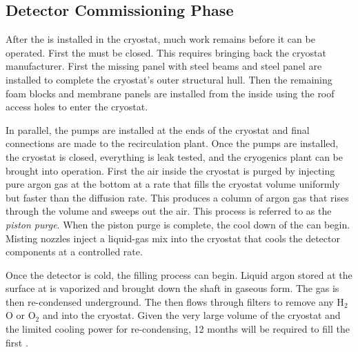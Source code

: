 \subsection{Detector Commissioning Phase}
\label{sec:fdsp-tc-inst-comiss}
After the  is installed in the cryostat, much work remains before it can be operated. 
First the  must be closed. 
This requires bringing back the cryostat manufacturer. 
First the missing panel with steel beams and steel panel are installed to complete the cryostat's outer structural hull. 
Then the remaining foam blocks and membrane panels
are installed from the inside using the roof access holes 
to enter the cryostat. 

In parallel, the \lar pumps are installed at the ends of the cryostat and final connections are made to the recirculation plant. 
Once the pumps are installed, the cryostat is closed, everything is leak tested, and the cryogenics plant can be brought into operation. 
First the air inside the cryostat is purged by injecting pure argon gas at the bottom  at a rate that fills the cryostat volume uniformly but faster than the diffusion
rate. 
This produces a column of argon gas that rises through the volume and sweeps out the air. 
This process is referred to as the \textit{piston purge}. 
When the piston purge is complete, the cool down of the  can begin. 
Misting nozzles inject a liquid-gas mix into the cryostat
that cools the detector components at a controlled rate. 

Once the detector is cold, the filling process can begin. 
Liquid argon stored at the surface  at \surf is vaporized and brought down the shaft in gaseous form. The gas is then re-condensed underground. 
The \lar then flows through filters to remove any H$_2$O or O$_2$ and into the cryostat.
Given the very large volume of the cryostat and the limited cooling power for re-condensing, \num{12} months will be required to fill the first . 

